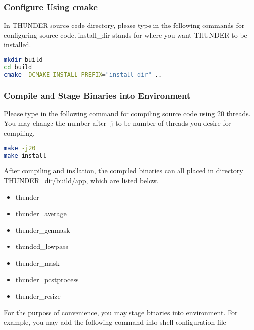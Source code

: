 \documentclass{article}
\begin{document}
            \subsubsection{Configure Using \textsf{cmake}}
            
                In THUNDER source code directory, please type in the following commands for configuring source code. \textsf{install\_dir} stands for where you want THUNDER to be installed.
            
                \begin{lstlisting}[language={sh}]
mkdir build
cd build
cmake -DCMAKE_INSTALL_PREFIX="install_dir" ..
                \end{lstlisting}
            
            \subsubsection{Compile and Stage Binaries into Environment}
            
                Please type in the following command for compiling source code using 20 threads. You may change the number after \textsf{-j} to be number of threads you desire for compiling.
                
                \begin{lstlisting}[language={sh}]
make -j20
make install
                \end{lstlisting}
                
                After compiling and insllation, the compiled binaries can all placed in directory \textsf{THUNDER\_dir/build/app}, which are listed below.
                \begin{itemize}
                    \item \textsf{thunder}
                    \item \textsf{thunder\_average}
                    \item \textsf{thunder\_genmask}
                    \item \textsf{thunded\_lowpass}
                    \item \textsf{thunder\_mask}
                    \item \textsf{thunder\_postprocess}
                    \item \textsf{thunder\_resize}
                \end{itemize}
                
                For the purpose of convenience, you may stage binaries into environment. For example, you may add the following command into shell configuration file
                
\end{document}

